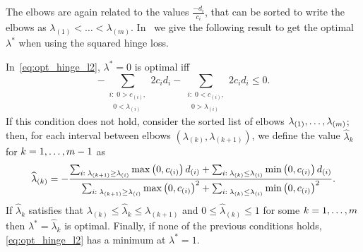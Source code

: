 The elbows are again related to the values $\frac{-d_i}{c_i}$, that can be sorted to write the elbows as ${\lambda}_{(1)} < \ldots < {\lambda}_{(m)}$.
In~\citet[Proposition 2]{RuizAD21} we give the following result to get the optimal $\lambda^*$ when using the squared hinge loss.
\begin{proposition}\label{prop:sqhinge_neurocom2020}
    In~\eqref{eq:opt_hinge_l2},
    $\lambda^*=0$ is optimal iff 
    \begin{equation}\nonumber
        -\sum_{\substack{i:\; 0 > c_{(i)},\\ \;\; 0 < \lambda_{(i)}}} {2 c_i d_i} - \sum_{\substack{i:\; 0 < c_{(i)},\\ \;\; 0 > \lambda_{(i)}}} {2 c_i d_i}  \leq 0 .
       \end{equation}
    If this condition does not hold, 
    consider the sorted list of elbows $\lambda_{(1)}, \ldots, \lambda_{(m)}$; then, for each interval between elbows $(\lambda_{(k)}, \lambda_{(k+1)})$, we define the value $\widehat{\lambda}_k$ for $k=1, \ldots,  m-1$ as %
\begin{equation}\label{eq:sol_hinge_2}
    \widehat{\lambda}_{(k)} = - \frac{\sum_{i:\; \lambda_{(k+1)} \geq \lambda_{(i)}} \mymax{0, c_{(i)}} d_{(i)} + \sum_{i:\; \lambda_{(k)} \leq \lambda_{(i)}} \mymin{0, c_{(i)}} d_{(i)}}{\sum_{i:\; \lambda_{(k+1)} \geq \lambda_{(i)}} \mymax{0, c_{(i)}}^2 + \sum_{i:\; \lambda_{(k)} \leq \lambda_{(i)}} \mymin{0, c_{(i)}}^2} .
\end{equation}
%
If $\widehat{\lambda}_k$ satisfies that $\lambda_{(k)} \leq \widehat{\lambda}_k \leq  \lambda_{(k+1)}$ and $0 \leq \widehat{\lambda}_{(k)} \leq 1$ for some $k=1, \ldots, m$ then $\lambda^* = \widehat{\lambda}_k$ is optimal.
Finally, if none of the previous conditions holds, \eqref{eq:opt_hinge_l2} has a minimum at $\lambda^* = 1$.
\end{proposition}
